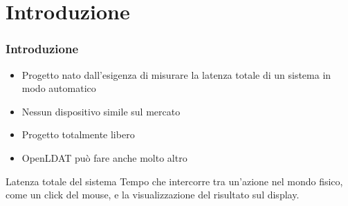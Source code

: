 \documentclass[xcolor={x11names}]{beamer}
\begin{document}
\hoffset=0mm %

\section{Introduzione}
\begin{frame}
	\frametitle{Introduzione}
	\begin{itemize}
		\item Progetto nato dall'esigenza di \alert{misurare la latenza totale di un sistema} in modo automatico
		\item \alert{Nessun dispositivo simile sul mercato}
		\item Progetto totalmente \alert{libero}
		\item \alert{OpenLDAT può fare anche molto altro}
	\end{itemize}
	\vspace{3mm}
	\begin{block}{Latenza totale del sistema}
		Tempo che intercorre tra un'azione nel mondo fisico, come un click del mouse, e la visualizzazione del risultato sul display.
	\end{block}
\end{frame}
\end{document}
